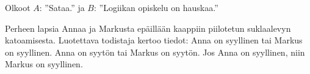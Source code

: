 \begin{tehtavasivu}
\begin{tehtava}
    \begin{vastaus}
    Olkoot $A$: ''Sataa.'' ja $B$: ''Logiikan opiskelu on hauskaa.''
        \begin{alakohdat}
        \end{alakohdat}
    \end{vastaus}
    
\end{tehtava}

\begin{tehtava}
    Perheen lapsia Annaa ja Markusta epäillään kaappiin piilotetun suklaalevyn katoamisesta. Luotettava todistaja kertoo tiedot:
Anna on syyllinen tai Markus on syyllinen.
Anna on syytön tai Markus on syytön. 
Jos Anna on syyllinen, niin Markus on syyllinen.


\end{tehtava}
\end{tehtavasivu}
